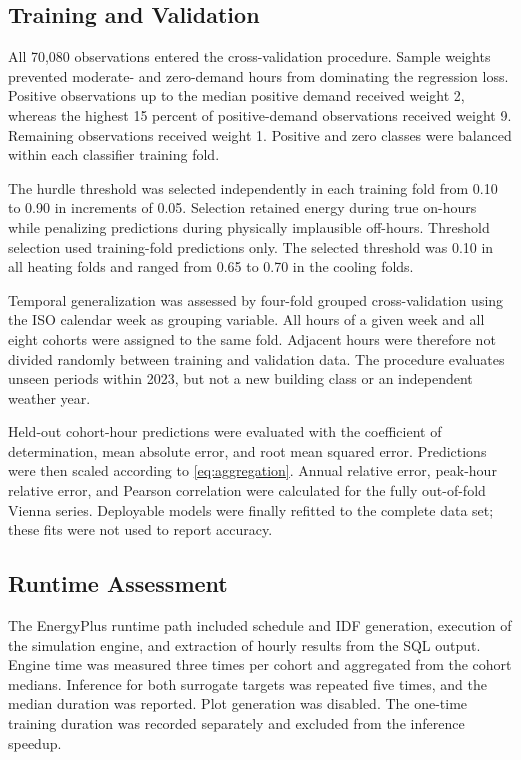 \documentclass[conference]{IEEEtran}
\begin{document}
\subsection{Training and Validation}

All 70,080 observations entered the cross-validation procedure. Sample weights
prevented moderate- and zero-demand hours from dominating the regression loss.
Positive observations up to the median positive demand received weight 2,
whereas the highest 15 percent of positive-demand observations received weight
9. Remaining observations received weight 1. Positive and zero classes were
balanced within each classifier training fold.

The hurdle threshold was selected independently in each training fold from
0.10 to 0.90 in increments of 0.05. Selection retained energy during true
on-hours while penalizing predictions during physically implausible off-hours.
Threshold selection used training-fold predictions only. The selected
threshold was 0.10 in all heating folds and ranged from 0.65 to 0.70 in the
cooling folds.

Temporal generalization was assessed by four-fold grouped cross-validation
using the ISO calendar week as grouping variable. All hours of a given week
and all eight cohorts were assigned to the same fold. Adjacent hours were
therefore not divided randomly between training and validation data. The
procedure evaluates unseen periods within 2023, but not a new building class
or an independent weather year.

Held-out cohort-hour predictions were evaluated with the coefficient of
determination, mean absolute error, and root mean squared error. Predictions
were then scaled according to \eqref{eq:aggregation}. Annual relative error,
peak-hour relative error, and Pearson correlation were calculated for the
fully out-of-fold Vienna series. Deployable models were finally refitted to
the complete data set; these fits were not used to report accuracy.

\subsection{Runtime Assessment}

The EnergyPlus runtime path included schedule and IDF generation, execution of
the simulation engine, and extraction of hourly results from the SQL output.
Engine time was measured three times per cohort and aggregated from the cohort
medians. Inference for both surrogate targets was repeated five times, and the
median duration was reported. Plot generation was disabled. The one-time
training duration was recorded separately and excluded from the inference
speedup.
\end{document}
